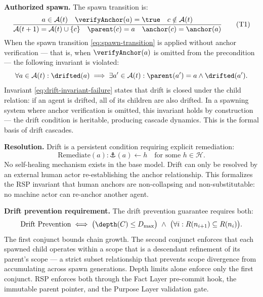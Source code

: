 \medskip
\noindent\textbf{Authorized spawn.} The spawn transition is:
\begin{equation}
\frac{a \in \mathcal{A}(t) \quad \verifyAnchor(a) = \true \quad c \notin \mathcal{A}(t)}
     {\mathcal{A}(t+1) = \mathcal{A}(t) \cup \{c\} \quad \parent(c) = a \quad \anchor(c) = \anchor(a)}
\tag{T1}
\label{eq:spawn-transition}
\end{equation}
When the spawn transition \eqref{eq:spawn-transition} is applied without anchor verification — that is, when $\verifyAnchor(a)$ is omitted from the precondition — the following invariant is violated:
\begin{equation}
\forall a \in \mathcal{A}(t): \drifted(a) \implies \exists a' \in \mathcal{A}(t): \parent(a') = a \land \drifted(a').
\label{eq:drift-invariant-failure}
\end{equation}
Invariant \eqref{eq:drift-invariant-failure} states that drift is closed under the child relation: if an agent is drifted, all of its children are also drifted. In a spawning system where anchor verification is omitted, this invariant holds by construction — the drift condition is heritable, producing cascade dynamics. This is the formal basis of drift cascades.

\medskip
\noindent\textbf{Resolution.} Drift is a persistent condition requiring explicit remediation:
\begin{equation}
\text{Remediate}(a): \anchor(a) \leftarrow h \quad \text{for some } h \in \mathcal{H}.
\label{eq:remediation}
\end{equation}
No self-healing mechanism exists in the base model. Drift can only be resolved by an external human actor re-establishing the anchor relationship. This formalizes the RSP invariant that human anchors are non-collapsing and non-substitutable: no machine actor can re-anchor another agent.

\medskip
\noindent\textbf{Drift prevention requirement.} The drift prevention guarantee requires both:
\begin{equation}
\text{Drift Prevention} \iff \bigl(\depth(C) \leq D_{\max}\bigr) \ \land \ \bigl(\forall i: R(n_{i+1}) \subseteq R(n_i)\bigr).
\label{eq:drift-prevention-requirement}
\end{equation}
The first conjunct bounds chain growth. The second conjunct enforces that each spawned child operates within a scope that is a descendant refinement of its parent's scope — a strict subset relationship that prevents scope divergence from accumulating across spawn generations. Depth limits alone enforce only the first conjunct. RSP enforces both through the Fact Layer pre-commit hook, the immutable parent pointer, and the Purpose Layer validation gate.